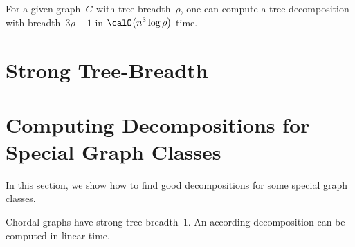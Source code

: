 \begin{corollary}
For a given graph~\( G \) with tree-breadth~\( \rho \), one can compute a tree-decomposition with breadth~\( 3 \rho - 1 \) in \( \calO \big ( n^3 \log \rho \big) \) time.
\end{corollary}


\section{Strong Tree-Breadth}




\section{Computing Decompositions for Special Graph Classes}
    \label{sec:SpecialGraphDecomp}

In this section, we show how to find good decompositions for some special graph classes.

\begin{theorem}
    \label{theo:chordalStb}
Chordal graphs have strong tree-breadth~\( 1 \).
An according decomposition can be computed in linear time.
\end{theorem}


